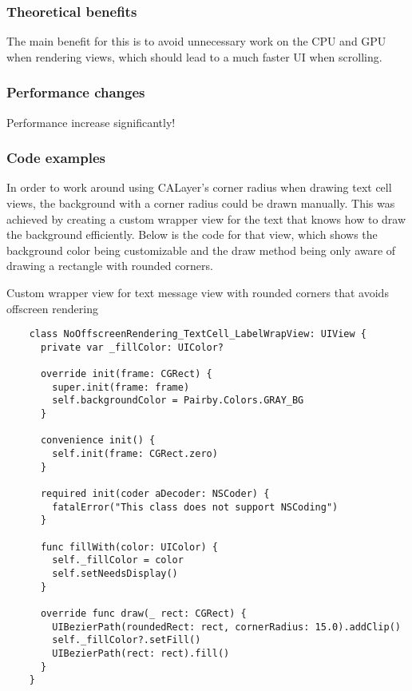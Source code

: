 \documentclass[a4paper,12pt]{article}
\begin{document}
\subsubsection*{Theoretical benefits}
The main benefit for this is to avoid unnecessary work on the CPU and GPU when rendering views, which should lead to a much faster UI when scrolling. 

\subsubsection*{Performance changes}
Performance increase significantly!

\subsubsection*{Code examples}
In order to work around using CALayer's corner radius when drawing text cell views, the background with a corner radius could be drawn manually. This was achieved by creating a custom wrapper view for the text that knows how to draw the background efficiently. Below is the code for that view, which shows the background color being customizable and the draw method being only aware of drawing a rectangle with rounded corners.
\begin{listing}[H]
  \caption{Custom wrapper view for text message view with rounded corners that avoids offscreen rendering}
  \begin{verbatim}
    class NoOffscreenRendering_TextCell_LabelWrapView: UIView {
      private var _fillColor: UIColor?

      override init(frame: CGRect) {
        super.init(frame: frame)
        self.backgroundColor = Pairby.Colors.GRAY_BG
      }

      convenience init() {
        self.init(frame: CGRect.zero)
      }

      required init(coder aDecoder: NSCoder) {
        fatalError("This class does not support NSCoding")
      }

      func fillWith(color: UIColor) {
        self._fillColor = color
        self.setNeedsDisplay()
      }

      override func draw(_ rect: CGRect) {
        UIBezierPath(roundedRect: rect, cornerRadius: 15.0).addClip()
        self._fillColor?.setFill()
        UIBezierPath(rect: rect).fill()
      }
    }
  \end{verbatim}
\end{listing}
\end{document}
